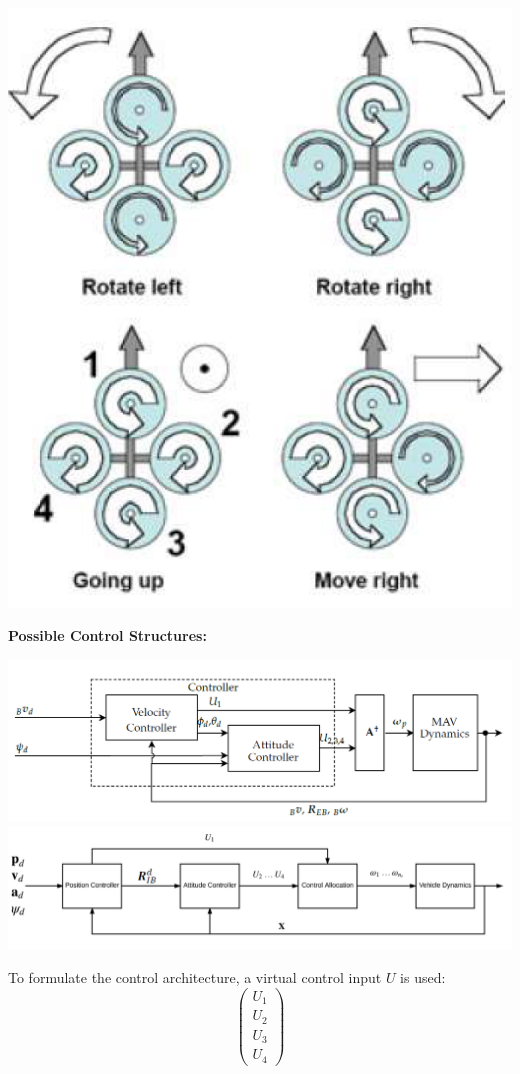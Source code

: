 \documentclass[a4paper, 8pt]{extarticle}
\begin{document}
\begin{multicols*}{3}
\begin{center}
\includegraphics[width=0.7\linewidth]{images/RC_MovingDirections.PNG}\\
\end{center}
\textbf{Possible Control Structures:}
\begin{center}
\includegraphics[width=1\linewidth]{images/RC_Control_Structure1.PNG}\\
    \includegraphics[width=1\linewidth]{images/RC_Control_Structure2.PNG}
\end{center}
To formulate the control architecture, a virtual control input $U$ is used:
$$ \begin{pmatrix}
U_1 \\U_2 \\U_3 \\U_4 

\end{pmatrix}$$
\end{multicols*}
\end{document}

